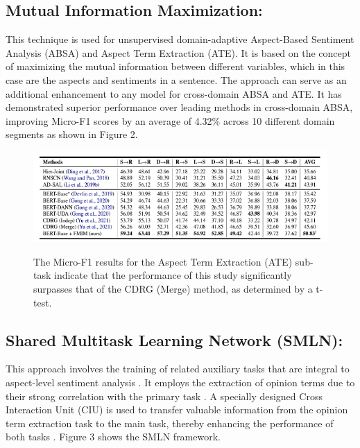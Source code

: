 \documentclass{article}
\begin{document}
\subsection{Mutual Information Maximization: }
This technique is used for unsupervised domain-adaptive Aspect-Based Sentiment Analysis (ABSA) and Aspect Term Extraction (ATE). It is based on the concept of maximizing the mutual information between different variables, which in this case are the aspects and sentiments in a sentence. The approach can serve as an additional enhancement to any model for cross-domain ABSA and ATE. It has demonstrated superior performance over leading methods in cross-domain ABSA, improving Micro-F1 scores by an average of 4.32\% across 10 different domain segments \cite{chen2022simple} as shown in Figure 2.
\begin{figure}
    \centering
    \includegraphics[width=1\linewidth]{MutualInformationMaximization.png}
    \caption{The Micro-F1 results for the Aspect Term Extraction (ATE) sub-task indicate that the performance of this study significantly surpasses that of the CDRG (Merge) method, as determined by a t-test.} 
    \label{fig:enter-label}
    \cite{chen2022simple}
\end{figure}

\subsection{Shared Multitask Learning Network (SMLN): }
This approach involves the training of related auxiliary tasks that are integral to aspect-level sentiment analysis \cite{Yao2021MultitaskLF}. It employs the 
 extraction of opinion terms due to their strong correlation with the primary task \cite{Yao2021MultitaskLF}. A specially designed Cross Interaction Unit (CIU) is used to transfer valuable information from the opinion term extraction task to the main task, thereby enhancing the performance of both tasks \cite{Yao2021MultitaskLF}. Figure 3 shows the SMLN framework.
\end{document}
